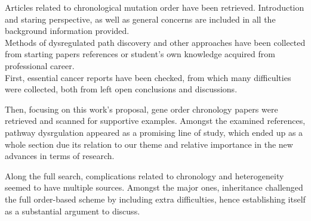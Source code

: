 Articles related to chronological mutation order have been retrieved. Introduction and staring perspective, as well as general concerns are included in all the background information provided.
\\

Methods of dysregulated path discovery and other approaches have been collected from starting papers references or student’s own knowledge acquired from professional career.
\\

First, essential cancer reports have been checked, from which many difficulties were collected, both from left open conclusions and discussions.

Then, focusing on this work's proposal, gene order chronology papers were retrieved and scanned for supportive examples. Amongst the examined references, pathway dysrgulation appeared as a promising line of study, which ended up as a whole section due its relation to our theme and relative importance in the new advances in terms of research.

Along the full search, complications related to chronology and heterogeneity seemed to have multiple sources. Amongst the major ones, inheritance challenged the full order-based scheme by including extra difficulties, hence establishing itself as a substantial argument to discuss.